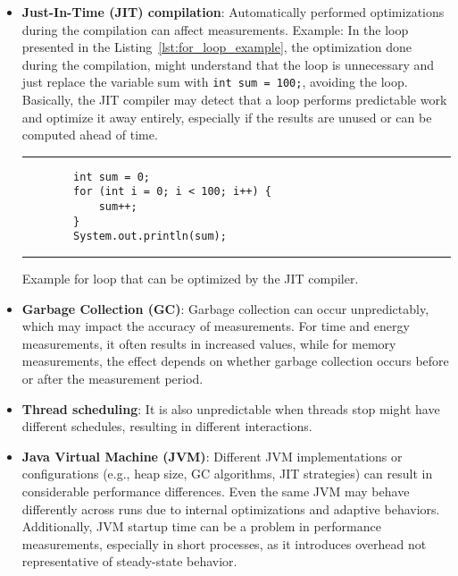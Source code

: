 \begin{itemize}
    \item \textbf{Just-In-Time (JIT) compilation}: Automatically performed optimizations during the compilation can affect measurements. Example: In the loop presented in the Listing~\ref{lst:for_loop_example}, the optimization done during the compilation, might understand that the loop is unnecessary and just replace the variable sum with \texttt{int sum = 100;}, avoiding the loop. Basically, the JIT compiler may detect that a loop performs predictable work and optimize it away entirely, especially if the results are unused or can be computed ahead of time.
    
    \begin{listing}[H]
    \noindent\rule{\linewidth}{0.4pt}
    \begin{verbatim}
        int sum = 0;
        for (int i = 0; i < 100; i++) {
            sum++;
        }
        System.out.println(sum);
    \end{verbatim}
    \noindent\rule{\linewidth}{0.4pt}
    \caption{Example for loop that can be optimized by the JIT compiler.}            
    \label{lst:for_loop_example}
    \end{listing}

    
    \item \textbf{Garbage Collection (GC)}: Garbage collection can occur unpredictably, which may impact the accuracy of measurements. For time and energy measurements, it often results in increased values, while for memory measurements, the effect depends on whether garbage collection occurs before or after the measurement period.
    
    \item \textbf{Thread scheduling}: It is also unpredictable when threads stop might have different schedules, resulting in different interactions.
    
    \item \textbf{Java Virtual Machine (JVM)}: Different JVM implementations or configurations (e.g., heap size, GC algorithms, JIT strategies) can result in considerable performance differences. Even the same JVM may behave differently across runs due to internal optimizations and adaptive behaviors. Additionally, JVM startup time can be a problem in performance measurements, especially in short processes, as it introduces overhead not representative of steady-state behavior.

\end{itemize}

